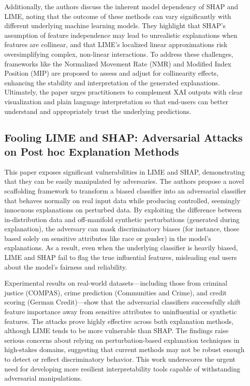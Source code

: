 \documentclass{article}
\begin{document}
Additionally, the authors discuss the inherent model dependency of SHAP and LIME, noting that the outcome of these methods can vary significantly with different underlying machine learning models. They highlight that SHAP’s assumption of feature independence may lead to unrealistic explanations when features are collinear, and that LIME’s localized linear approximations risk oversimplifying complex, non-linear interactions. To address these challenges, frameworks like the Normalized Movement Rate (NMR) and Modified Index Position (MIP) are proposed to assess and adjust for collinearity effects, enhancing the stability and interpretation of the generated explanations. Ultimately, the paper urges practitioners to complement XAI outputs with clear visualization and plain language interpretation so that end-users can better understand and appropriately trust the underlying predictions.

\subsection{Fooling LIME and SHAP: Adversarial Attacks on Post hoc
Explanation Methods}
This paper exposes significant vulnerabilities in LIME and SHAP, demonstrating that they can be easily manipulated by adversaries. The authors propose a novel scaffolding framework to transform a biased classifier into an adversarial classifier that behaves normally on real input data while producing controlled, seemingly innocuous explanations on perturbed data. By exploiting the difference between in-distribution data and off-manifold synthetic perturbations (generated during explanation), the adversary can mask discriminatory biases (for instance, those based solely on sensitive attributes like race or gender) in the model’s explanations. As a result, even when the underlying classifier is heavily biased, LIME and SHAP fail to flag the true influential features, misleading end users about the model’s fairness and reliability.

Experimental results on real-world datasets—including those from criminal justice (COMPAS), crime prediction (Communities and Crime), and credit scoring (German Credit)—show that the adversarial classifiers successfully shift feature importance away from sensitive attributes to uninfluential or synthetic features. The attacks prove highly effective across both explanation methods, although LIME tends to be more vulnerable than SHAP. The findings raise serious concerns about relying on perturbation-based explanation techniques in high-stakes domains, suggesting that current methods may not be robust enough to detect or reflect discriminatory behavior. This work underscores the urgent need for developing more resilient interpretability tools capable of withstanding adversarial manipulations.
\end{document}
